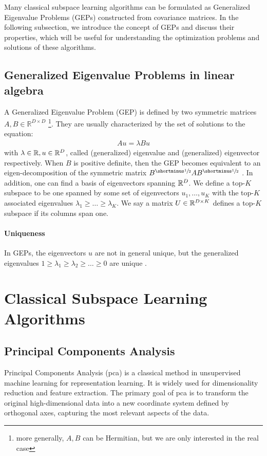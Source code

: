 Many classical subspace learning algorithms can be formulated as Generalized Eigenvalue Problems (GEPs) constructed from covariance matrices. In the following subsection, we introduce the concept of GEPs and discuss their properties, which will be useful for understanding the optimization problems and solutions of these algorithms.

\subsection{Generalized Eigenvalue Problems in linear algebra}
A Generalized Eigenvalue Problem (GEP) is defined by two symmetric matrices $A,B\in \mathbb{R}^{D\times D}$ \citep{stewart_matrix_1990}\footnote{more generally, $A,B$ can be Hermitian, but we are only interested in the real case}.
They are usually characterized by the set of solutions to the equation:
\begin{align}
    \label{eq:igep}
    Au=\lambda Bu
\end{align}
with $\lambda \in \mathbb{R}, u \in \mathbb{R}^D$, called (generalized) eigenvalue and (generalized) eigenvector respectively.
When $B$ is positive definite, then the GEP becomes equivalent to an eigen-decomposition of the symmetric matrix $B^\mhalf A B^\mhalf$ \citep{ghojogh2019eigenvalue}.
In addition, one can find a basis of eigenvectors spanning $\mathbb{R}^D$.
We define a top-$K$ subspace to be one spanned by some set of eigenvectors {$u_1,\dots,u_K$} with the top-$K$ associated eigenvalues $\lambda_1 \geq \dots \geq \lambda_K$.
We say a matrix $U \in \mathbb{R}^{D \times K}$ defines a top-$K$ subspace if its columns span one.

\paragraph{Uniqueness}
In GEPs, the eigenvectors $u$ are not in general unique, but the generalized eigenvalues $1 \geq \lambda_1 \geq \lambda_2 \geq \dots \geq 0$ are unique \citep{mills1988calculation}.

\section{Classical Subspace Learning Algorithms}

\subsection{Principal Components Analysis}

Principal Components Analysis \citep{hotelling1933analysis} (\acrshort{pca}) is a classical method in unsupervised machine learning for representation learning.
It is widely used for dimensionality reduction and feature extraction.
The primary goal of \acrshort{pca} is to transform the original high-dimensional data into a new coordinate system defined by orthogonal axes, capturing the most relevant aspects of the data.

